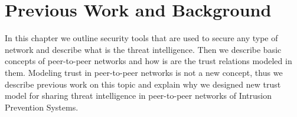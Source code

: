 \chapter{Previous Work and Background}
\label{ch:previous-work-background}
In this chapter we outline security tools that are used to secure any type of network and describe what is the threat intelligence.
Then we describe basic concepts of peer-to-peer networks and how is are the trust relations modeled in them.
Modeling trust in peer-to-peer networks is not a new concept, thus we describe previous work on this topic and explain why we designed new trust model for sharing threat intelligence in peer-to-peer networks of Intrusion Prevention Systems.



